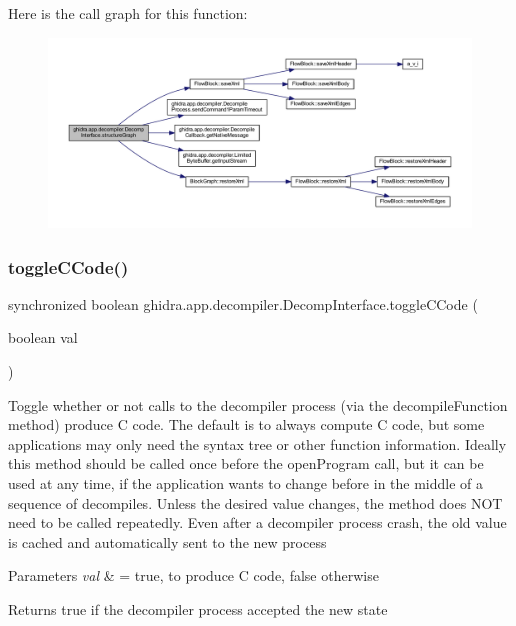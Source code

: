 Here is the call graph for this function\+:
\nopagebreak
\begin{figure}[H]
\begin{center}
\leavevmode
\includegraphics[width=350pt]{classghidra_1_1app_1_1decompiler_1_1_decomp_interface_a5cd68852b39b8dc136790b8741ee029d_cgraph}
\end{center}
\end{figure}
\mbox{\label{classghidra_1_1app_1_1decompiler_1_1_decomp_interface_ad43588ca711cada0fbc8421ebff714f5}} 
\subsubsection{\texorpdfstring{toggleCCode()}{toggleCCode()}}
{\footnotesize\ttfamily synchronized boolean ghidra.\+app.\+decompiler.\+Decomp\+Interface.\+toggle\+C\+Code (\begin{DoxyParamCaption}\item[{boolean}]{val }\end{DoxyParamCaption})\hspace{0.3cm}{\ttfamily [inline]}}

Toggle whether or not calls to the decompiler process (via the decompile\+Function method) produce C code. The default is to always compute C code, but some applications may only need the syntax tree or other function information. Ideally this method should be called once before the open\+Program call, but it can be used at any time, if the application wants to change before in the middle of a sequence of decompiles. Unless the desired value changes, the method does N\+OT need to be called repeatedly. Even after a decompiler process crash, the old value is cached and automatically sent to the new process 
\begin{DoxyParams}{Parameters}
{\em val} & = true, to produce C code, false otherwise \\
\hline
\end{DoxyParams}
\begin{DoxyReturn}{Returns}
true if the decompiler process accepted the new state 
\end{DoxyReturn}


